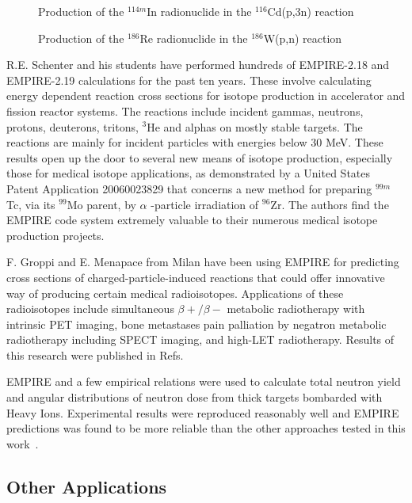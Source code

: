 \begin{figure}[htpb]
\caption{Production of the $^{114m}$In radionuclide in the $^{116}$Cd(p,3n)
reaction}
\label{fig:cd116_p3n}
\end{figure}

\begin{figure}[htpb]
\caption{Production of the $^{186}$Re radionuclide in the $^{186}$W(p,n)
reaction}
\label{fig:w186_pn}
\end{figure}

R.E. Schenter and his students have performed hundreds of EMPIRE-2.18 and
EMPIRE-2.19 calculations for the past ten years. These involve calculating
energy dependent reaction cross sections for isotope production in
accelerator and fission reactor systems. The reactions include incident
gammas, neutrons, protons, deuterons, tritons, $^{3}$He and alphas on mostly
stable targets. The reactions are mainly for incident particles with
energies below 30 MeV. These results open up the door to several new means
of isotope production, especially those for medical isotope applications, as
demonstrated by a United States Patent Application 20060023829 that concerns
a new method for preparing $^{99m}$Tc, via its $^{99}$Mo parent, by $\alpha $%
-particle irradiation of $^{96}$Zr. The authors find the EMPIRE code system
extremely valuable to their numerous medical isotope production projects.

F. Groppi and E. Menapace from Milan have been using EMPIRE for predicting
cross sections of charged-particle-induced reactions that could offer
innovative way of producing certain medical radioisotopes. Applications
of these radioisotopes include simultaneous $\beta +/\beta -$ metabolic
radiotherapy with intrinsic PET imaging, bone metastases pain palliation by
negatron metabolic radiotherapy including SPECT imaging, and high-LET
radiotherapy. Results of this research were published in Refs.~\cite%
{Menapace:04, Menapace:05, Groppi:05, Groppi:05a, Groppi:06, Alfassi:06,
Persico:06}

EMPIRE and a few empirical relations were used to calculate total neutron
yield and angular distributions of neutron dose from thick targets bombarded
with Heavy Ions. Experimental results were reproduced reasonably well and
EMPIRE predictions was found to be more reliable than the other approaches
tested in this work~\cite{Nandy:07}.

\subsection{Other Applications}

